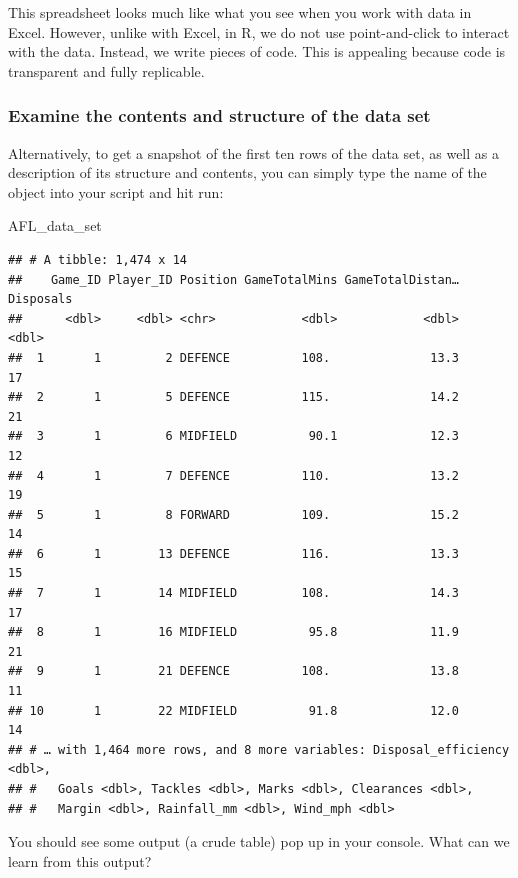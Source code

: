 \documentclass[
]{article}
\newenvironment{Shaded}{\begin{snugshade}}{\end{snugshade}}
\newcommand{\NormalTok}[1]{#1}
\begin{document}
This spreadsheet looks much like what you see when you work with data in
Excel. However, unlike with Excel, in R, we do not use point-and-click
to interact with the data. Instead, we write pieces of code. This is
appealing because code is transparent and fully replicable.

\hypertarget{examine-the-contents-and-structure-of-the-data-set}{%
\subsubsection{Examine the contents and structure of the data
set}\label{examine-the-contents-and-structure-of-the-data-set}}

Alternatively, to get a snapshot of the first ten rows of the data set,
as well as a description of its structure and contents, you can simply
type the name of the object into your script and hit run:

\begin{Shaded}
\begin{Highlighting}[]
\NormalTok{AFL\_data\_set}
\end{Highlighting}
\end{Shaded}

\begin{verbatim}
## # A tibble: 1,474 x 14
##    Game_ID Player_ID Position GameTotalMins GameTotalDistan… Disposals
##      <dbl>     <dbl> <chr>            <dbl>            <dbl>     <dbl>
##  1       1         2 DEFENCE          108.              13.3        17
##  2       1         5 DEFENCE          115.              14.2        21
##  3       1         6 MIDFIELD          90.1             12.3        12
##  4       1         7 DEFENCE          110.              13.2        19
##  5       1         8 FORWARD          109.              15.2        14
##  6       1        13 DEFENCE          116.              13.3        15
##  7       1        14 MIDFIELD         108.              14.3        17
##  8       1        16 MIDFIELD          95.8             11.9        21
##  9       1        21 DEFENCE          108.              13.8        11
## 10       1        22 MIDFIELD          91.8             12.0        14
## # … with 1,464 more rows, and 8 more variables: Disposal_efficiency <dbl>,
## #   Goals <dbl>, Tackles <dbl>, Marks <dbl>, Clearances <dbl>,
## #   Margin <dbl>, Rainfall_mm <dbl>, Wind_mph <dbl>
\end{verbatim}

You should see some output (a crude table) pop up in your console. What
can we learn from this output?
\end{document}
